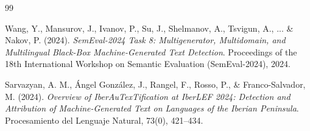 \documentclass{article}
\begin{document}
\begin{thebibliography}{99}

Wang, Y., Mansurov, J., Ivanov, P., Su, J., Shelmanov, A., Tsvigun, A., ... \& Nakov, P. (2024).
\textit{SemEval-2024 Task 8: Multigenerator, Multidomain, and Multilingual Black-Box Machine-Generated Text Detection}.
Proceedings of the 18th International Workshop on Semantic Evaluation (SemEval-2024), 2024.

Sarvazyan, A. M., Ángel González, J., Rangel, F., Rosso, P., \& Franco-Salvador, M. (2024).
\textit{Overview of IberAuTexTification at IberLEF 2024: Detection and Attribution of Machine-Generated Text on Languages of the Iberian Peninsula}.
Procesamiento del Lenguaje Natural, 73(0), 421–434.


\end{thebibliography}
\end{document}
